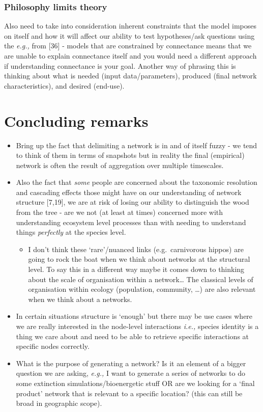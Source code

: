 \documentclass[
]{article}
\providecommand{\tightlist}{%
  \setlength{\itemsep}{0pt}\setlength{\parskip}{0pt}}\usepackage{longtable,booktabs,array}
\begin{document}
\subsubsection{Philosophy limits theory}\label{philosophy-limits-theory}

Also need to take into consideration inherent constraints that the model
imposes on itself and how it will affect our ability to test
hypotheses/ask questions using the \emph{e.g.,} from {[}36{]} - models
that are constrained by connectance means that we are unable to explain
connectance itself and you would need a different approach if
understanding connectance is your goal. Another way of phrasing this is
thinking about what is needed (input data/parameters), produced (final
network characteristics), and desired (end-use).

\section{Concluding remarks}\label{concluding-remarks}

\begin{itemize}
\item
  Bring up the fact that delimiting a network is in and of itself fuzzy
  - we tend to think of them in terms of snapshots but in reality the
  final (empirical) network is often the result of aggregation over
  multiple timescales.
\item
  Also the fact that \emph{some} people are concerned about the
  taxonomic resolution and cascading effects those might have on our
  understanding of network structure {[}7,19{]}, we are at risk of
  losing our ability to distinguish the wood from the tree - are we not
  (at least at times) concerned more with understanding ecosystem level
  processes than with needing to understand things \emph{perfectly} at
  the species level.

  \begin{itemize}
  \tightlist
  \item
    I don't think these `rare'/nuanced links (e.g.~carnivorous hippos)
    are going to rock the boat when we think about networks at the
    structural level. To say this in a different way maybe it comes down
    to thinking about the scale of organisation within a network\ldots{}
    The classical levels of organisation within ecology (population,
    community, \ldots) are also relevant when we think about a networks.
  \end{itemize}
\item
  In certain situations structure is `enough' but there may be use cases
  where we are really interested in the node-level interactions
  \emph{i.e.,} species identity is a thing we care about and need to be
  able to retrieve specific interactions at specific nodes correctly.
\item
  What is the purpose of generating a network? Is it an element of a
  bigger question we are asking, \emph{e.g.,} I want to generate a
  series of networks to do some extinction simulations/bioenergetic
  stuff OR are we looking for a `final product' network that is relevant
  to a specific location? (this can still be broad in geographic scope).
\end{itemize}
\end{document}
